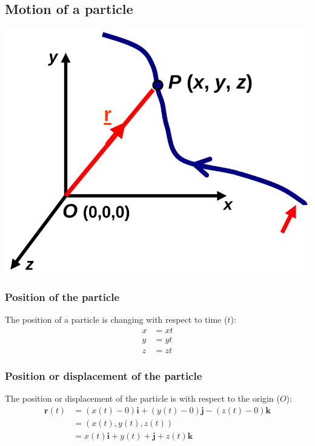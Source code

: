 \documentclass[11pt]{article}
\begin{document}
\subsection{Motion of a particle}
\label{sec:orgcf77f8e}
\begin{center}
\includegraphics[width=.9\linewidth]{./images/motion-of-a-particle.png}
\end{center}

\subsubsection{Position of the particle}
\label{sec:org1ae82b9}
The position of a particle is changing with respect to time (\(t\)):
\begin{align*}
x &= xt \\
y &= yt \\
z &= zt
\end{align*}

\subsubsection{Position or displacement of the particle}
\label{sec:org970f418}
The position or displacement of the particle is with respect to the origin (\(O\)):
\begin{align*}
\boldsymbol{r} (t) &= (x(t) - 0) \boldsymbol{i} + (y(t) - 0) \boldsymbol{j} - (z(t) - 0) \boldsymbol{k} \\
&= (x(t), y(t), z(t)) \\
&= x(t) \boldsymbol{i} + y(t) + \boldsymbol{j} + z(t) \boldsymbol{k}
\end{align*}
\end{document}
